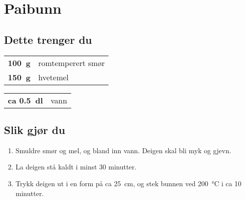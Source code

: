 \section*{Paibunn}
\label{pai:paibunn}


\subsection*{Dette trenger du}


\begin{table}[!htbp]
    \begin{tabular}[t]{rl}
        \textbf{\SI{100}{\gram}}            & romtemperert smør \\
        \textbf{\SI{150}{\gram}}            & hvetemel              
    \end{tabular}
    \qquad
    \begin{tabular}[t]{rl}
        \textbf{ca \SI{0,5}{\deci\litre}}   & vann 
    \end{tabular}
\end{table}



\subsection*{Slik gjør du}

\begin{enumerate}
    \item 
    Smuldre smør og mel, og bland inn vann.
    Deigen skal bli myk og gjevn.
    
    \item 
    La deigen stå kaldt i minst 30 minutter.
    
    \item
    Trykk deigen ut i en form på ca \SI{25}{\centi\meter}, og stek bunnen ved \SI{200}{\celsius} i ca 10 minutter.
    
\end{enumerate}